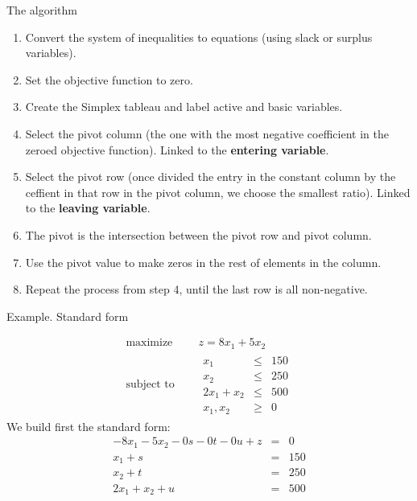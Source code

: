 \documentclass[c]{beamer}
\begin{document}
\begin{frame}{The algorithm}
\begin{enumerate}
  \item Convert the system of inequalities to equations (using slack or surplus variables).
  \item Set the objective function to zero.
  \item Create the Simplex tableau and label active and basic variables.
  \item Select the pivot column (the one with the most negative coefficient in the zeroed objective function). Linked to the {\bf entering variable}.
  \item Select the pivot row (once divided the entry in the constant column by the ceffient in that row in the pivot column, we choose the smallest ratio). Linked to the {\bf leaving variable}.
  \item The pivot is the intersection between the pivot row and pivot column.
  \item Use the pivot value to make zeros in the rest of elements in the column.
  \item Repeat the process from step 4, until the last row is all non-negative.
\end{enumerate}

\end{frame}

\begin{frame}{Example. Standard form}


  \begin{equation*}
    \begin{aligned}
      \text{maximize } \quad & z = 8x_1+5x_2 \\
      \text{subject to }\quad &
      \begin{array}{rcl}
        x_1 &\leq &150 \\
        x_2 &\leq &250 \\
        2x_1+x_2 &\leq &500 \\
        x_1,x_2 &\geq& 0
      \end{array}
    \end{aligned}
  \end{equation*}
We build first the standard form:
\begin{eqnarray*}
  -8x_1-5x_2-0s-0t-0u+z&=&0\\
  x_1+s&=&150\\
  x_2+t&=&250\\
  2x_1+x_2+u&=&500
\end{eqnarray*}
\end{frame}
\end{document}
